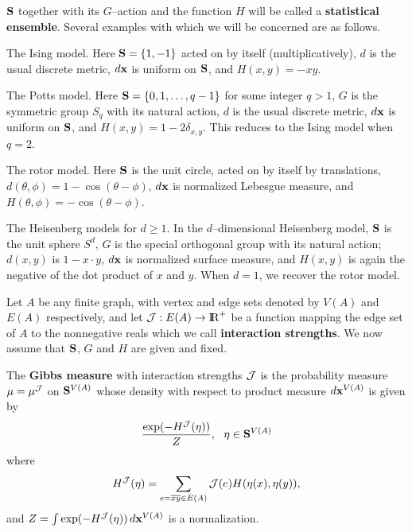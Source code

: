 $\S$ together with its $G$--action and the function $H$ will be called a
{\bf statistical ensemble}.
Several examples with which we will be concerned are as follows.

\begin{eg} \label{eg:ising}
The Ising model.  Here $\S = \{ 1 , -1 \}$
acted on by itself (multiplicatively), $d$ is the usual discrete metric,
$\dx$ is uniform on $\S$, and $H (x , y) = - xy$.  
\end{eg}

\begin{eg} \label{eg:potts}  
The Potts model.  Here $\S = \{ 0 , 1 , \ldots ,
q-1 \}$ for some integer $q > 1$, $G$ is the symmetric group $S_q$ with its
natural action, $d$ is the usual discrete metric,
$\dx$ is uniform on $\S$, and $H (x , y) = 1 - 2 \delta_{x,y}$.
This reduces to the Ising model when $q = 2$.
\end{eg}

\begin{eg} \label{eg:rotor}
The rotor model.  Here $\S$ is the unit 
circle, acted on by itself by translations, 
$d(\theta , \phi) = 1- \cos (\theta - \phi)$,
$\dx$ is normalized Lebesgue measure, and 
$H (\theta , \phi) = - \cos (\theta - \phi)$.  
\end{eg}

\begin{eg} \label{eg:spherical} 
The Heisenberg models for $d \ge 1$.
In the $d$--dimensional
Heisenberg model, $\S$ is the unit sphere $S^d$, $G$ is
the special orthogonal group with its natural action; $d(x,y)$ is $1-x\cdot y$,
$\dx$ is normalized surface measure, 
and $H (x , y)$ is again the negative of the dot product of $x$ and $y$. 
When $d=1$, we recover the rotor model.
\end{eg}

Let $A$ be any finite graph, with vertex and edge sets denoted by
$V(A)$ and $E(A)$ respectively, and let $\J : E (A) \rightarrow \R^+$
be a function mapping the edge set of $A$ to the nonnegative reals which
we call {\bf interaction strengths}.
We now assume that $\S$, $G$ and $H$ are given and fixed.

\begin{defn} \label{defn:Gibbs}
The {\bf Gibbs measure} with interaction strengths $\J$ is
the probability measure $\mu=\mu^{\J}$ on $\S^{V(A)}$ whose density
with respect to product measure $\dx^{V(A)}$ is given by
$$ { \exp (- H^\J (\eta)) \over Z},\,\,\,\, \eta\in \S^{V(A)} $$
where
$$ H^\J(\eta) = \sum_{e = \overline{xy} \in E(A)} 
   \J (e) H(\eta (x) , \eta (y)) ,$$
and $Z = \int \exp (- H^\J(\eta)) \, \dx^{V(A)}$ is a normalization. 
\end{defn}

